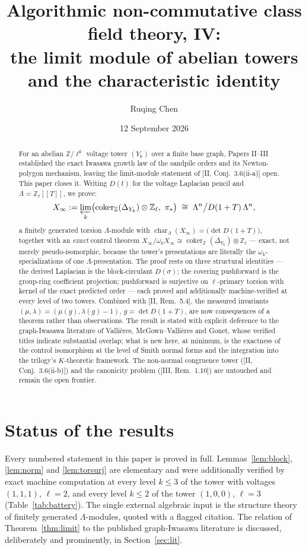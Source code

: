 \documentclass[11pt]{amsart}
\title[Algorithmic non-commutative class field theory, IV]
{Algorithmic non-commutative class field theory, IV:\\
the limit module of abelian towers\\ and the characteristic identity}
\author{Ruqing Chen}
\date{12 September 2026}
\numberwithin{equation}{section}
\theoremstyle{definition}
\theoremstyle{remark}
\newcommand{\Z}{\mathbb{Z}}
\newcommand{\Zl}{\Z_\ell}
\newcommand{\La}{\Lambda}
\newcommand{\coker}{\operatorname{coker}}
\newcommand{\car}{\operatorname{char}_{\La}}
\begin{document}
\begin{abstract}
For an abelian $\Z/\ell^k$ voltage tower $(Y_k)$ over a finite base graph, Papers
II--III established the exact Iwasawa growth law of the sandpile orders and its
Newton-polygon mechanism, leaving the limit-module statement of
[II, Conj.~3.6(ii-a)] open. This paper closes it. Writing $D(t)$ for the voltage
Laplacian pencil and $\La=\Zl[[T]]$, we prove:
\[
X_\infty:=\varprojlim_k\bigl(\coker_\Z(\Delta_{Y_k})\otimes\Zl,\ \pi_*\bigr)
\;\cong\;\La^n\big/D(1+T)\,\La^n,
\]
a finitely generated torsion $\La$-module with
$\car(X_\infty)=\bigl(\det D(1+T)\bigr)$, together with an \emph{exact} control
theorem $X_\infty/\omega_kX_\infty\cong\coker_\Z(\Delta_{Y_k})\otimes\Zl$ --- exact,
not merely pseudo-isomorphic, because the tower's presentations are literally the
$\omega_k$-specializations of one $\La$-presentation. The proof rests on three
structural identities --- the derived Laplacian is the block-circulant $D(\sigma)$;
the covering pushforward is the group-ring coefficient projection; pushforward is
surjective on $\ell$-primary torsion with kernel of the exact predicted order --- each
proved and additionally machine-verified at every level of two towers. Combined with
[II, Rem.~5.4], the measured invariants $(\mu,\lambda)=(\mu(g),\lambda(g)-1)$,
$g=\det D(1+T)$, are now consequences of a theorem rather than observations. The
result is stated with explicit deference to the graph-Iwasawa literature of
Vallières, McGown--Vallières and Gonet, whose verified titles indicate substantial
overlap; what is new here, at minimum, is the exactness of the control isomorphism at
the level of Smith normal forms and the integration into the trilogy's $K$-theoretic
framework. The non-normal congruence tower ([II, Conj.~3.6(ii-b)]) and the canonicity
problem ([III, Rem.~1.10]) are untouched and remain the open frontier.
\end{abstract}

\maketitle

\section*{Status of the results}

Every numbered statement in this paper is proved in full. Lemmas~\ref{lem:block},
\ref{lem:norm} and \ref{lem:torsurj} are elementary and were additionally verified by
exact machine computation at every level $k\le3$ of the tower with voltages $(1,1,1)$,
$\ell=2$, and every level $k\le2$ of the tower $(1,0,0)$, $\ell=3$
(Table~\ref{tab:battery}). The single external algebraic input is the structure
theory of finitely generated $\La$-modules, quoted with a flagged citation. The
relation of Theorem~\ref{thm:limit} to the published graph-Iwasawa literature is
discussed, deliberately and prominently, in Section~\ref{sec:lit}.
\end{document}
